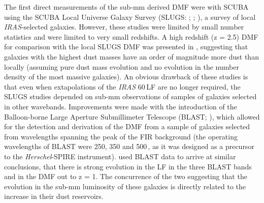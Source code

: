 The first direct measurements of the sub-mm derived DMF were with SCUBA using the SCUBA Local Universe Galaxy Survey (SLUGS: \citealt{Dunne_2000}; \citealt{Dunne_2001}; \citealt{Vlahakis_2005}), a survey of local \textit{IRAS}-selected galaxies. However, these studies were limited by small number statistics and were limited to very small redshifts. A high redshift (z = 2.5) DMF for comparison with the local SLUGS DMF was presented in \citealt{Dunne_2003}, suggesting that galaxies with the highest dust masses have an order of magnitude more dust than locally (assuming pure dust mass evolution and no evolution in the number density of the most massive galaxies). An obvious drawback of these studies is that even when extapolations of the \textit{IRAS} 60\,\micron LF are no longer required, the SLUGS studies depended on sub-mm observations of samples of galaxies selected in other wavebands. Improvements were made with the introduction of the Balloon-borne Large Aperture Submillimeter Telescope (BLAST; \citealt{Devlin_2009}), which allowed for the detection and derivation of the DMF from a sample of galaxies selected from wavelengths spanning the peak of the FIR background (the operating wavelengths of BLAST were 250, 350 and 500\,\micron, as it was designed as a precursor to the \textit{Herschel}-SPIRE instrument). \citealt{Eales_2009} used BLAST data to arrive at similar conclusions, that there is strong evolution in the LF in the three BLAST bands and in the DMF out to z = 1. The concurrence of the two suggesting that the evolution in the sub-mm luminosity of these galaxies is directly related to the increase in their dust reservoirs. 
